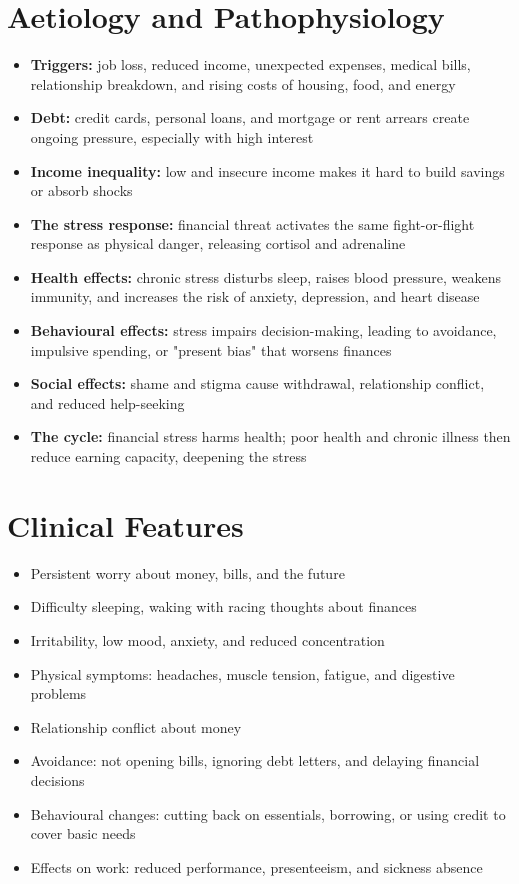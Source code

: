 \section*{Aetiology and Pathophysiology}
\begin{itemize}
    \item \textbf{Triggers:} job loss, reduced income, unexpected expenses, medical bills, relationship breakdown, and rising costs of housing, food, and energy
    \item \textbf{Debt:} credit cards, personal loans, and mortgage or rent arrears create ongoing pressure, especially with high interest
    \item \textbf{Income inequality:} low and insecure income makes it hard to build savings or absorb shocks
    \item \textbf{The stress response:} financial threat activates the same fight-or-flight response as physical danger, releasing cortisol and adrenaline
    \item \textbf{Health effects:} chronic stress disturbs sleep, raises blood pressure, weakens immunity, and increases the risk of anxiety, depression, and heart disease
    \item \textbf{Behavioural effects:} stress impairs decision-making, leading to avoidance, impulsive spending, or "present bias" that worsens finances
    \item \textbf{Social effects:} shame and stigma cause withdrawal, relationship conflict, and reduced help-seeking
    \item \textbf{The cycle:} financial stress harms health; poor health and chronic illness then reduce earning capacity, deepening the stress
\end{itemize}

\section*{Clinical Features}
\begin{itemize}
    \item Persistent worry about money, bills, and the future
    \item Difficulty sleeping, waking with racing thoughts about finances
    \item Irritability, low mood, anxiety, and reduced concentration
    \item Physical symptoms: headaches, muscle tension, fatigue, and digestive problems
    \item Relationship conflict about money
    \item Avoidance: not opening bills, ignoring debt letters, and delaying financial decisions
    \item Behavioural changes: cutting back on essentials, borrowing, or using credit to cover basic needs
    \item Effects on work: reduced performance, presenteeism, and sickness absence
\end{itemize}

